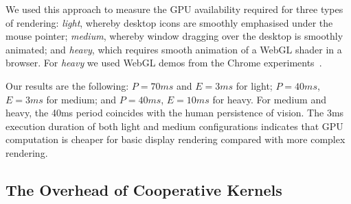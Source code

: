 \documentclass[sigconf]{acmart}
\newcommand{\mytablong}{Table~}
\newcommand{\mysec}{Sec.~}
\begin{document}
{We used this approach to measure the GPU availability required for three
types of rendering: \emph{light}, whereby desktop icons are smoothly
emphasised under the mouse pointer; \emph{medium}, whereby window
dragging over the desktop is smoothly animated; and \emph{heavy}, which
requires smooth animation of a WebGL shader in a browser.  For
\emph{heavy} we used WebGL demos from the Chrome
experiments~\cite{chrome-experiments}.%



Our results are the following: $P=70ms$ and $E=3ms$ for light;
$P=40ms$, $E=3ms$ for medium; and $P=40ms$, $E=10ms$ for heavy. For
medium and heavy, the 40ms period coincides with the human persistence
of vision. The 3ms execution duration of both light and medium
configurations indicates that GPU computation is cheaper for basic
display rendering compared with more complex rendering.%




\subsection{The Overhead of Cooperative Kernels}\label{sec:overhead}

}
\end{document}
